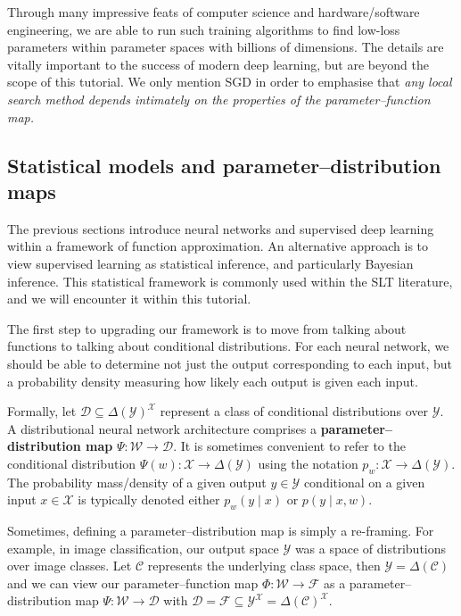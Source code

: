 \documentclass[11pt]{article}
\newcommand{\X}{\mathcal{X}}
\newcommand{\Y}{\mathcal{Y}}
\newcommand{\W}{\mathcal{W}}
\newcommand{\F}{\mathcal{F}}
\newcommand{\D}{\mathcal{D}}
\newcommand{\C}{\mathcal{C}}
\begin{document}
Through many impressive feats of computer science and hardware/software
engineering, we are able to run such training algorithms to find low-loss
parameters within parameter spaces with billions of dimensions. The details are
vitally important to the success of modern deep learning, but are beyond the
scope of this tutorial. We only mention SGD in order to emphasise that
\emph{any local search method depends intimately on the properties of the
parameter--function map.}



\subsection{Statistical models and parameter--distribution maps}
\label{sec:prelims:stats}

The previous sections introduce neural networks and supervised deep learning
within a framework of function approximation. An alternative approach is to
view supervised learning as statistical inference, and particularly Bayesian
inference. This statistical framework is commonly used within the SLT
literature, and we will encounter it within this tutorial.

The first step to upgrading our framework is to move from talking about
functions to talking about conditional distributions. For each neural network,
we should be able to determine not just the output corresponding to each
input, but a probability density measuring how likely each output is given each
input.

Formally, let $\D \subseteq \Delta(\Y)^\X$ represent a class of
conditional distributions over $\Y$.
A distributional neural network architecture comprises a
\textbf{parameter--distribution map}
    $\Psi : \W \to \D$.
It is sometimes convenient to refer to the conditional distribution
    $\Psi(w) : \X \to \Delta(\Y)$
using the notation
    $p_w : \X \to \Delta(\Y)$.
The probability mass/density of a given output $y \in \Y$ conditional on a
given input $x \in \X$ is typically denoted either
    $p_w(y \mid x)$ or $p(y \mid x, w)$.

Sometimes, defining a parameter--distribution map is simply a re-framing. For
example, in image classification, our output space $\Y$ was a space of
distributions over image classes. Let $\C$ represents the underlying class
space, then $\Y = \Delta(\C)$ and we can view our parameter--function map
$\Phi : \W \to \F$ as a parameter--distribution map $\Psi : \W \to \D$ with
    $\D = \F \subseteq \Y^\X = \Delta(\C)^\X$.
\end{document}
